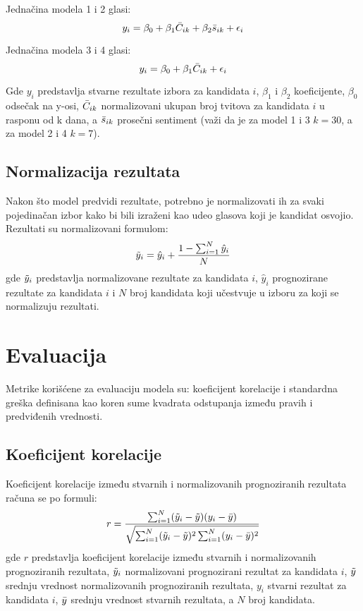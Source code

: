Jednačina modela 1 i 2 glasi:
\begin{equation*}
    y_i = \beta_0 + \beta_1 \Bar{C}_{ik} + \beta_2 \Bar{s}_{ik} + \epsilon_i
\end{equation*}

Jednačina modela 3 i 4 glasi:
\begin{equation*}
    y_i = \beta_0 + \beta_1 \Bar{C}_{ik} + \epsilon_i
\end{equation*}

Gde $y_i$ predstavlja stvarne rezultate izbora za kandidata $i$, $\beta_1$ i $\beta_2$ koeficijente, $\beta_0$ odsečak na y-osi, $\Bar{C}_{ik}$ normalizovani ukupan broj tvitova za kandidata $i$ u rasponu od k dana, a $\Bar{s}_{ik}$ prosečni sentiment (važi da je za model 1 i 3 $k = 30$, a za model 2 i 4 $k = 7$).

\subsection{Normalizacija rezultata}

Nakon što model predvidi rezultate, potrebno je normalizovati ih za svaki pojedinačan izbor kako bi
bili izraženi kao udeo glasova koji je kandidat osvojio. Rezultati su normalizovani formulom:
\begin{equation*}
    \Tilde{y}_i = \hat{y}_i + \frac{1 - \sum^N_{i=1}\hat{y}_i}{N}
\end{equation*}
gde $\Tilde{y}_i$ predstavlja normalizovane rezultate za kandidata $i$, $\hat{y}_i$ prognozirane rezultate za kandidata $i$ i $N$ broj kandidata koji učestvuje u izboru za koji se normalizuju rezultati.

\section{Evaluacija}

Metrike korišćene za evaluaciju modela su: koeficijent korelacije i standardna greška definisana kao
koren sume kvadrata odstupanja između pravih i predviđenih vrednosti.

\subsection{Koeficijent korelacije}

Koeficijent korelacije između stvarnih i normalizovanih prognoziranih rezultata računa se po formuli:
\begin{equation*}
    r = \frac{
        \sum^N_{i=1}(\Tilde{y}_i - \Tilde{y})(y_i - \Bar{y})
    }{
        \sqrt{\sum^N_{i=1}(\Tilde{y}_i - \Tilde{y})^2\sum^N_{i=1}(y_i - \Bar{y})^2}
    }
\end{equation*}
gde $r$ predstavlja koeficijent korelacije između stvarnih i normalizovanih prognoziranih rezultata, $\Tilde{y}_i$
normalizovani prognozirani rezultat za kandidata $i$, $\Tilde{y}$ srednju vrednost normalizovanih prognoziranih
rezultata, $y_i$ stvarni rezultat za kandidata $i$, $\Bar{y}$ srednju vrednost stvarnih rezultata, a $N$ broj kandidata.

